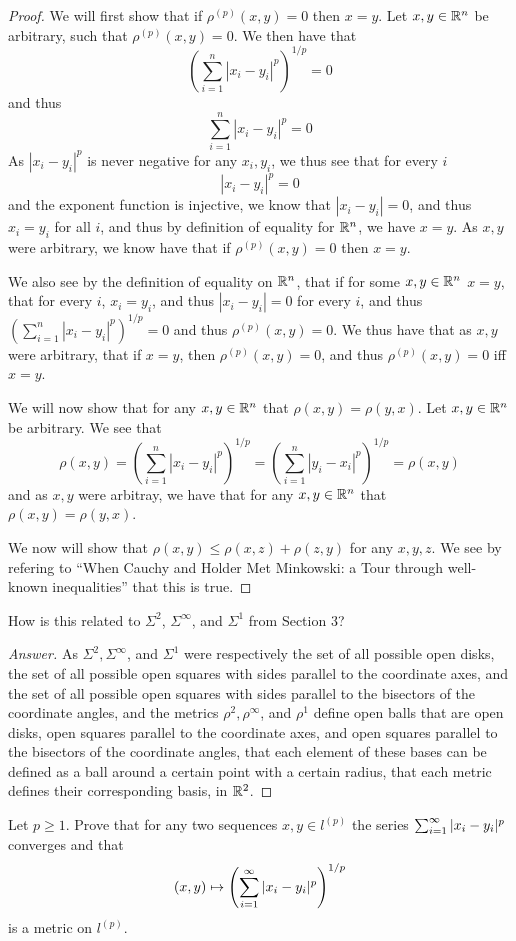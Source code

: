 \begin{proof}
  We will first show that if $\rho^{(p)}(x,y)=0$ then $x=y$. Let $x,y
  \in \mathbb{R}^n$ be arbitrary, such that $\rho^{(p)}(x,y)=0$. We then have that 
  $$(\sum_{i=1}^n |x_i - y_i|^p)^{1/p} =0$$
  and thus
  $$\sum_{i=1}^n |x_i - y_i|^p =0$$
  As $|x_i - y_i|^p$ is never negative for any $x_i,y_i$, we thus see
  that for every $i$
  $$|x_i - y_i|^p =0$$ and the exponent function is injective, we know
  that $|x_i - y_i|=0$, and thus $x_i=y_i$ for all $i$, and thus by
  definition of equality for $\mathbb{R}^n$, we have $x=y$. As $x,y$ were
  arbitrary, we know have that  if $\rho^{(p)}(x,y)=0$ then $x=y$.

  We also see by the definition of equality on $\mathbb{R}^n$, that if for
  some $x,y\in \mathbb{R}^n$ $x=y$, that for
  every $i$, $x_i=y_i$, and thus $|x_i-y_i|=0$ for every $i$, and thus
  $(\sum_{i=1}^n |x_i - y_i|^p)^{1/p}=0$  and thus
  $\rho^{(p)}(x,y)=0$. We thus have that as $x,y$ were arbitrary, that
  if $x=y$, then $\rho^{(p)}(x,y)=0$, and thus $\rho^{(p)}(x,y)=0$ iff
  $x=y$.

  We will now show that for any $x,y\in \mathbb{R}^n$ that
  $\rho(x,y)=\rho(y,x)$. Let $x,y\in \mathbb{R}^n$ be arbitrary.
  We see that 
  $$\rho(x,y) = 
  (\sum_{i=1}^n |x_i - y_i|^p)^{1/p}= 
  (\sum_{i=1}^n |y_i - x_i|^p)^{1/p}= 
  \rho(x,y)$$
  and as $x,y$ were arbitray, we have that 
   for any $x,y\in \mathbb{R}^n$ that
  $\rho(x,y)=\rho(y,x)$.

  We now will show that $\rho(x,y) \leq \rho(x,z) + \rho(z,y)$ for any
  $x,y,z$. We see by refering to ``When Cauchy and Holder Met
  Minkowski: a Tour through well-known inequalities'' that this is true.
\end{proof}

\begin{minorEx}%
    [Riddle]
    How is this related to $\Sigma^2$, $\Sigma^{\infty}$, and $\Sigma^1$ from
    Section 3?
\end{minorEx}

\begin{proof}[Answer]
  As $\Sigma^2,\Sigma^\infty$, and $\Sigma^1$ were respectively the
  set of all possible open disks,  the set of all possible open
  squares with sides parallel to the coordinate axes,
  and the set of all possible open squares with sides
  parallel to the bisectors of the coordinate angles, and the metrics 
  $\rho^2,\rho^\infty$, and $\rho^1$ define open balls that are
 open disks, open squares parallel to the coordinate axes, and open
 squares parallel to the bisectors of the coordinate angles, that each
 element of these bases can be defined as a ball around a certain
 point with a certain radius, that each metric defines their
 corresponding basis, in $\mathbb{R}^2$.
\end{proof}

\begin{minorEx}%
    Let $p \geq 1$. Prove that for any two sequences $x, y \in l^{(p)}$ the
    series $\sum_{i=1}^{\infty} |x_i - y_i|^p$ converges and that
    \[
        (x, y) \mapsto \left( \sum_{i=1}^{\infty} |x_i - y_i|^p
        \right)^{1/p}
    \]
    is a metric on $l^{(p)}$.
\end{minorEx}
